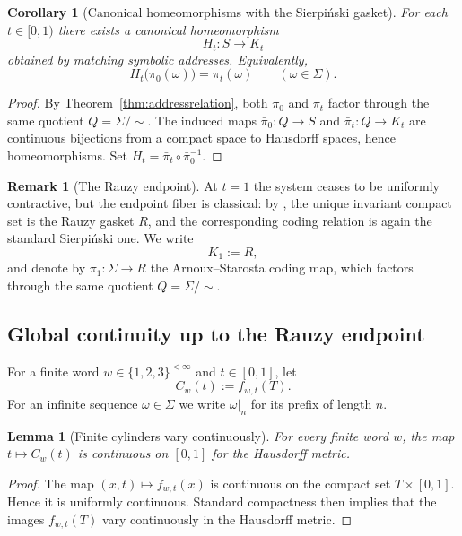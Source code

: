 \documentclass[11pt]{amsart}
\newtheorem{lemma}[lemma]{Lemma}
\newtheorem{corollary}[corollary]{Corollary}
\theoremstyle{definition}
\newtheorem{remark}[remark]{Remark}
\begin{document}
\begin{corollary}[Canonical homeomorphisms with the Sierpi\'nski gasket]\label{cor:homeos}
For each $t\in[0,1)$ there exists a canonical homeomorphism
\[
H_t:S\to K_t
\]
obtained by matching symbolic addresses. Equivalently,
\[
H_t\bigl(\pi_0(\omega)\bigr)=\pi_t(\omega)\qquad (\omega\in\Sigma).
\]
\end{corollary}

\begin{proof}
By Theorem~\ref{thm:addressrelation}, both $\pi_0$ and $\pi_t$ factor through the same quotient $Q=\Sigma/\!\sim$. The induced maps $\bar\pi_0:Q\to S$ and $\bar\pi_t:Q\to K_t$ are continuous bijections from a compact space to Hausdorff spaces, hence homeomorphisms. Set $H_t=\bar\pi_t\circ\bar\pi_0^{-1}$.
\end{proof}

\begin{remark}[The Rauzy endpoint]\label{rem:rauzyendpoint}
At $t=1$ the system ceases to be uniformly contractive, but the endpoint fiber is classical: by \cite[Theorem~2 and \S4]{ArnouxStarosta2013}, the unique invariant compact set is the Rauzy gasket $R$, and the corresponding coding relation is again the standard Sierpi\'nski one. We write
\[
K_1:=R,
\]
and denote by $\pi_1:\Sigma\to R$ the Arnoux--Starosta coding map, which factors through the same quotient $Q=\Sigma/\!\sim$.
\end{remark}

\subsection{Global continuity up to the Rauzy endpoint}

For a finite word $w\in\{1,2,3\}^{<\infty}$ and $t\in[0,1]$, let
\[
C_w(t):=f_{w,t}(T).
\]
For an infinite sequence $\omega\in\Sigma$ we write $\omega|_n$ for its prefix of length $n$.

\begin{lemma}[Finite cylinders vary continuously]\label{lem:finitecylinders}
For every finite word $w$, the map $t\mapsto C_w(t)$ is continuous on $[0,1]$ for the Hausdorff metric.
\end{lemma}

\begin{proof}
The map $(x,t)\mapsto f_{w,t}(x)$ is continuous on the compact set $T\times[0,1]$. Hence it is uniformly continuous. Standard compactness then implies that the images $f_{w,t}(T)$ vary continuously in the Hausdorff metric.
\end{proof}
\end{document}
